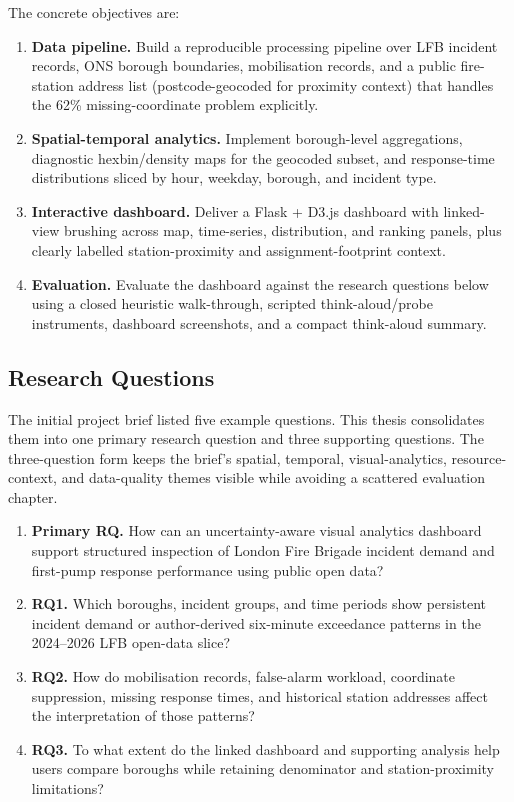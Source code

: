The concrete objectives are:

\begin{enumerate}
    \item \textbf{Data pipeline.} Build a reproducible processing pipeline over LFB incident records, ONS borough boundaries, mobilisation records, and a public fire-station address list (postcode-geocoded for proximity context) that handles the 62\% missing-coordinate problem explicitly.
    \item \textbf{Spatial-temporal analytics.} Implement borough-level aggregations, diagnostic hexbin/density maps for the geocoded subset, and response-time distributions sliced by hour, weekday, borough, and incident type.
    \item \textbf{Interactive dashboard.} Deliver a Flask + D3.js dashboard with linked-view brushing across map, time-series, distribution, and ranking panels, plus clearly labelled station-proximity and assignment-footprint context.
    \item \textbf{Evaluation.} Evaluate the dashboard against the research questions below using a closed heuristic walk-through, scripted think-aloud/probe instruments, dashboard screenshots, and a compact think-aloud summary.
\end{enumerate}

\subsection{Research Questions}

The initial project brief listed five example questions. This thesis consolidates them into one primary research question and three supporting questions. The three-question form keeps the brief's spatial, temporal, visual-analytics, resource-context, and data-quality themes visible while avoiding a scattered evaluation chapter.

\begin{enumerate}
    \item \textbf{Primary RQ.} How can an uncertainty-aware visual analytics dashboard support structured inspection of London Fire Brigade incident demand and first-pump response performance using public open data?
    \item \textbf{RQ1.} Which boroughs, incident groups, and time periods show persistent incident demand or author-derived six-minute exceedance patterns in the 2024--2026 LFB open-data slice?
    \item \textbf{RQ2.} How do mobilisation records, false-alarm workload, coordinate suppression, missing response times, and historical station addresses affect the interpretation of those patterns?
    \item \textbf{RQ3.} To what extent do the linked dashboard and supporting analysis help users compare boroughs while retaining denominator and station-proximity limitations?
\end{enumerate}

